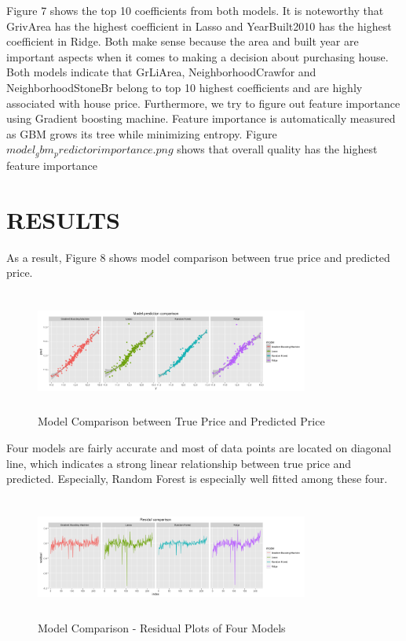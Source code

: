 \documentclass[letterpaper, 10 pt, conference]{ieeeconf}\usepackage[]{graphicx}\usepackage[]{color}
\begin{document}
Figure 7 shows the top 10 coefficients from both models. It is noteworthy that GrivArea has the highest coefficient in Lasso and YearBuilt2010 has the highest coefficient in Ridge. Both make sense because the area and built year are important aspects when it comes to making a decision about purchasing house. Both models indicate that GrLiArea, NeighborhoodCrawfor and NeighborhoodStoneBr belong to top 10 highest coefficients and are highly associated with house price. Furthermore, we try to figure out feature importance using Gradient boosting machine. Feature importance is automatically measured as GBM grows its tree while minimizing entropy. Figure $model_gbm_predictor importance.png$ shows that overall quality has the highest feature importance 

\section{RESULTS}

As a result, Figure 8 shows model comparison between true price and predicted price. 

   \begin{figure}[thpb]
      \centering
      \includegraphics[width =  9cm, height = 4cm]{../images/model_prediction_comparison.png}
      \caption{Model Comparison between True Price and Predicted Price}
      \label{figurelabel}
   \end{figure}

Four models are fairly accurate and most of data points are located on diagonal line, which indicates a strong linear relationship between true price and predicted. Especially, Random Forest is especially well fitted among these four. 

   \begin{figure}[thpb]
      \centering
      \includegraphics[width =  9cm, height = 4cm]{../images/model_residual_comparison.png}
      \caption{Model Comparison - Residual Plots of Four Models}
      \label{figurelabel}
   \end{figure}
\end{document}
